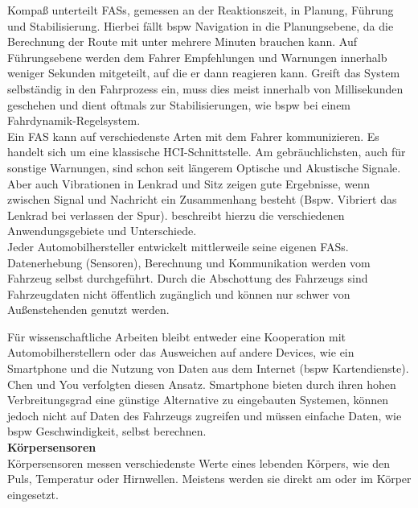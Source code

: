 {Kompaß \cite{fasFuture} unterteilt \acl{FASs}, gemessen an der Reaktionszeit, in Planung, Führung und Stabilisierung. Hierbei fällt \acl{bspw} Navigation in die Planungsebene, da die Berechnung der Route mit unter mehrere Minuten brauchen kann. Auf Führungsebene werden dem Fahrer Empfehlungen und Warnungen innerhalb weniger Sekunden mitgeteilt, auf die er dann reagieren kann. Greift das System selbständig in den Fahrprozess ein, muss dies meist innerhalb von Millisekunden geschehen und dient oftmals zur Stabilisierungen, wie \acl{bspw} bei einem Fahrdynamik-Regelsystem.\\

Ein \acl{FAS} kann auf verschiedenste Arten mit dem Fahrer kommunizieren. Es handelt sich um eine klassische HCI-Schnittstelle. Am gebräuchlichsten, auch für sonstige Warnungen, sind schon seit längerem Optische und Akustische Signale. Aber auch Vibrationen in Lenkrad und Sitz zeigen gute Ergebnisse, wenn zwischen Signal und Nachricht ein Zusammenhang besteht (Bspw. Vibriert das Lenkrad bei verlassen der Spur).
\cite{Bertoldi:2010:MAD:2002368.2002370} beschreibt hierzu die verschiedenen Anwendungsgebiete und Unterschiede. \\

Jeder Automobilhersteller entwickelt mittlerweile seine eigenen \acl{FASs}. Datenerhebung (Sensoren), Berechnung und Kommunikation werden vom Fahrzeug selbst durchgeführt. Durch die Abschottung des Fahrzeugs sind Fahrzeugdaten nicht öffentlich zugänglich und können nur schwer von Außenstehenden genutzt werden. 

Für wissenschaftliche Arbeiten bleibt entweder eine Kooperation mit Automobilherstellern oder das Ausweichen auf andere Devices, wie ein Smartphone und die Nutzung von Daten aus dem Internet (\acl{bspw} Kartendienste). Chen \cite{Chen:2015:ISV:2742647.2742659} und You \cite{You:2013:CAA:2462456.2465428} verfolgten diesen Ansatz. Smartphone bieten durch ihren hohen Verbreitungsgrad eine günstige Alternative zu eingebauten Systemen, können jedoch nicht auf Daten des Fahrzeugs zugreifen und müssen einfache Daten, wie \acl{bspw} Geschwindigkeit, selbst berechnen.\\



\textbf{Körpersensoren}\\
Körpersensoren messen verschiedenste Werte eines lebenden Körpers, wie den Puls, Temperatur oder Hirnwellen. Meistens werden sie direkt am oder im Körper eingesetzt.\\

}
